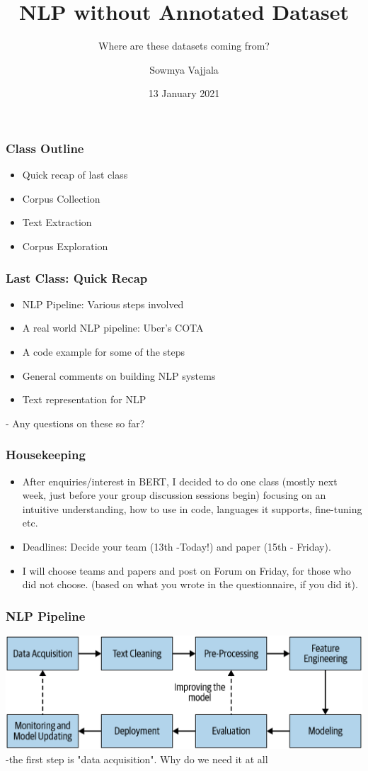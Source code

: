 \documentclass{beamer}
\author[Sowmya Vajjala]{Sowmya Vajjala}
\title[SfSNLP]{NLP without Annotated Dataset}
\subtitle{Where are these datasets coming from?}
\date{13 January 2021}
\institute{Seminar f\"ur Sprachwissenschaft, University of T\"ubingen, Germany}
\begin{document}
\begin{frame}\titlepage
\end{frame}

\begin{frame}
\frametitle{Class Outline}
\begin{itemize}
    \item Quick recap of last class
    \item Corpus Collection
    \item Text Extraction
    \item Corpus Exploration
\end{itemize}
\end{frame}

\begin{frame}
\frametitle{Last Class: Quick Recap}
\begin{itemize}
    \item NLP Pipeline: Various steps involved
    \item A real world NLP pipeline: Uber's COTA
    \item A code example for some of the steps
    \item General comments on building NLP systems
    \item Text representation for NLP
\end{itemize}
- Any questions on these so far?
\end{frame}

\begin{frame}
\frametitle{Housekeeping}
\begin{itemize}
    \item After enquiries/interest in BERT, I decided to do one class (mostly next week, just before your group discussion sessions begin) focusing on an intuitive understanding, how to use in code, languages it supports, fine-tuning etc.
    \item Deadlines: Decide your team (13th -Today!) and paper (15th - Friday). 
    \item I will choose teams and papers and post on Forum on Friday, for those who did not choose. (based on what you wrote in the questionnaire, if you did it).
\end{itemize}
\end{frame}

\begin{frame}
\frametitle{NLP Pipeline}
\includegraphics[width=\textwidth]{figures/pipeline.png} \pause
-the first step is "data acquisition". Why do we need it at all
\end{frame}
\end{document}
